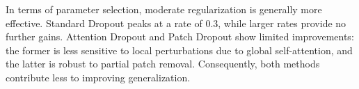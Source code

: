 In terms of parameter selection, moderate regularization is generally more effective. Standard Dropout peaks at a rate of 0.3, while larger rates provide no further gains. Attention Dropout and Patch Dropout show limited improvements: the former is less sensitive to local perturbations due to global self-attention, and the latter is robust to partial patch removal. Consequently, both methods contribute less to improving generalization.
